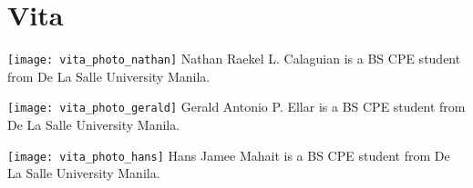 \chapter{Vita}

\vfill
\texttt{[image: vita\_photo\_nathan]}
Nathan Raekel L. Calaguian is a BS CPE student from De La Salle University Manila.

\vfill

\texttt{[image: vita\_photo\_gerald]}
Gerald Antonio P. Ellar is a BS CPE student from De La Salle University Manila.

\vfill

\texttt{[image: vita\_photo\_hans]}
Hans Jamee Mahait is a BS CPE student from De La Salle University Manila.

\vfill